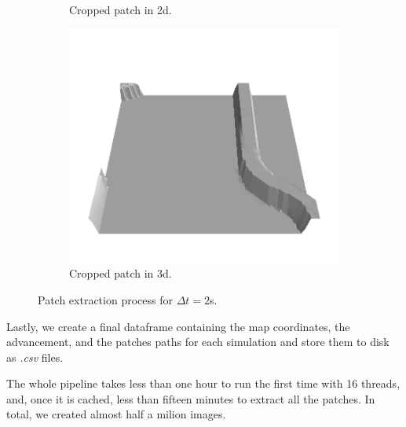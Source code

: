 \documentclass[../document.tex]{subfiles}
\begin{document}
\begin{figure}[H]
\begin{subfigure}[b]{0.45\textwidth}
        \caption{Cropped patch in 2d.}
    \end{subfigure}
    \begin{subfigure}[b]{0.45\textwidth}
        \includegraphics[width=\textwidth]{../img/3/crop/0.png}
        \caption{Cropped patch in 3d.}
    \end{subfigure}
\caption{Patch extraction process for $\Delta t = 2$s.}   
\end{figure}
Lastly, we create a final dataframe containing the map coordinates, the advancement, and the patches paths for each simulation and store them to disk as \emph{.csv} files. 

The whole pipeline takes less than one hour to run the first time with 16 threads, and, once it is cached, less than fifteen minutes to extract all the patches. In total, we created almost half a milion images.
\end{document}
